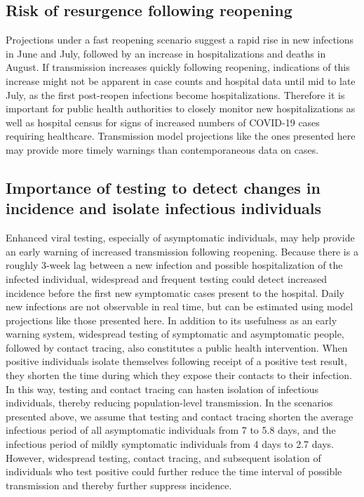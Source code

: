 \documentclass[11pt]{article}
\begin{document}
\subsection*{Risk of resurgence following reopening} 

Projections under a fast reopening scenario suggest a rapid rise in new infections in June and July, followed by an increase in hospitalizations and deaths in August.  If transmission increases quickly following reopening, indications of this increase might not be apparent in case counts and hospital data until mid to late July, as the first post-reopen infections become hospitalizations.  Therefore it is important for public health authorities to closely monitor new hospitalizations as well as hospital census for signs of increased numbers of COVID-19 cases requiring healthcare. Transmission model projections like the ones presented here may provide more timely warnings than contemporaneous data on cases.  


\subsection*{Importance of testing to detect changes in incidence and isolate infectious individuals}



Enhanced viral testing, especially of asymptomatic individuals, may help provide an early warning of increased transmission following reopening.  Because there is a roughly 3-week lag between a new infection and possible hospitalization of the infected individual, widespread and frequent testing could detect increased incidence before the first new symptomatic cases present to the hospital.  Daily new infections are not observable in real time, but can be estimated using model projections like those presented here.  In addition to its usefulness as an early warning system, widespread testing of symptomatic and asymptomatic people, followed by contact tracing, also constitutes a public health intervention. When positive individuals isolate themselves following receipt of a positive test result, they shorten the time during which they expose their contacts to their infection. In this way, testing and contact tracing can hasten isolation of infectious individuals, thereby reducing population-level transmission.  In the scenarios presented above, we assume that testing and contact tracing shorten the average infectious period of all asymptomatic individuals from 7 to 5.8 days, and the infectious period of mildly symptomatic individuals from 4 days to 2.7 days. However, widespread testing, contact tracing, and subsequent isolation of individuals who test positive could further reduce the time interval of possible transmission and thereby further suppress incidence.
\end{document}
